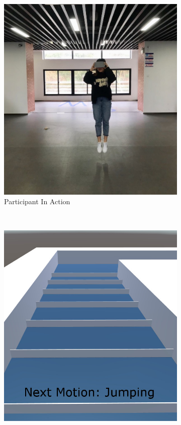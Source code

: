\documentclass[review]{vgtc}                 %
\begin{document}
\begin{figure}[!htpb]
	\centering
	\begin{subfigure}{0.45\linewidth}
		\centering
		\includegraphics[width=\linewidth]{./figs/track_real.jpg}
		\caption[]{\label{fig:track_real} Participant In Action
		}
	\end{subfigure}
	~
	\begin{subfigure}{0.45\linewidth}
		\centering
		\includegraphics[width=\linewidth]{./figs/track_close.jpg}

\end{subfigure}
\end{figure}
\end{document}
